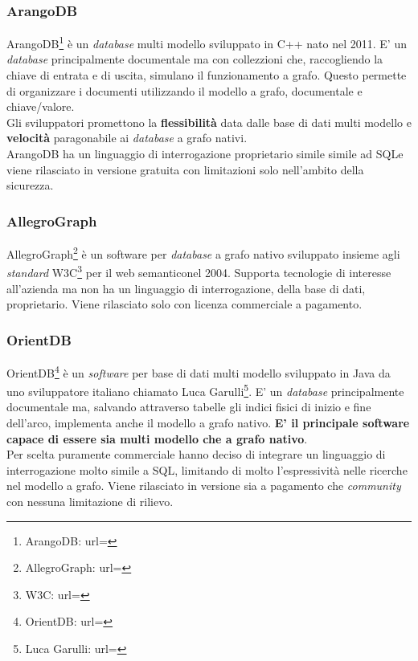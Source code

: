 \subsubsection{ArangoDB}
ArangoDB\footnote{ArangoDB: url= } è un \textit{database} multi modello sviluppato in C++ nato nel 2011. E' un \textit{database} principalmente documentale ma con collezzioni che, raccogliendo la chiave di entrata e di uscita, simulano il funzionamento a grafo. Questo permette di organizzare i documenti utilizzando il modello a grafo, documentale e chiave/valore.\\
Gli sviluppatori promettono la \textbf{flessibilità} data dalle base di dati multi modello e \textbf{velocità} paragonabile ai \textit{database} a grafo nativi.\\
ArangoDB ha un linguaggio di interrogazione proprietario simile simile ad SQL\glsfirstoccur e viene rilasciato in versione gratuita con limitazioni solo nell'ambito della sicurezza.
\subsubsection{AllegroGraph}
AllegroGraph\footnote{AllegroGraph: url= } è un software per \textit{database} a grafo nativo sviluppato insieme agli \textit{standard} W3C\footnote{W3C: url= } per il web semantico\glsfirstoccur  nel 2004. Supporta tecnologie di interesse all'azienda ma non ha un linguaggio di interrogazione, della base di dati, proprietario. Viene rilasciato solo con licenza commerciale a pagamento.
\subsubsection{OrientDB}
OrientDB\footnote{OrientDB: url= } è un \textit{software} per base di dati multi modello sviluppato in Java da uno sviluppatore italiano chiamato Luca Garulli\footnote{Luca Garulli: url= }. E' un \textit{database} principalmente documentale ma, salvando attraverso tabelle gli indici fisici di inizio e fine dell'arco, implementa anche il modello a grafo nativo. \textbf{E' il principale software capace di essere sia multi modello che a grafo nativo}.\\
Per scelta puramente commerciale hanno deciso di integrare un linguaggio di interrogazione molto simile a SQL, limitando di molto l'espressività nelle ricerche nel modello a grafo. Viene rilasciato in versione sia a pagamento che \textit{community} con nessuna limitazione di rilievo.
